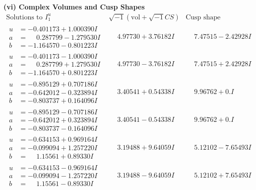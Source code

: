 \documentclass[1p]{elsarticle_modified}
\theoremstyle{definition}
\newcommand{\I}{\sqrt{-1}}
\begin{document}
\newpage\flushleft \textbf{(vi) Complex Volumes and Cusp Shapes}
$$\begin{array}{c|c|c}  
\text{Solutions to }I^u_{1}& \I (\text{vol} + \sqrt{-1}CS) & \text{Cusp shape}\\
 \hline 
\begin{aligned}
u &= -0.401173 + 1.000390 I \\
a &= \phantom{-}0.287799 - 1.279530 I \\
b &= -1.164570 - 0.801223 I\end{aligned}
 & \phantom{-}4.97730 + 3.76182 I & \phantom{-}7.47515 - 2.42928 I \\ \hline\begin{aligned}
u &= -0.401173 - 1.000390 I \\
a &= \phantom{-}0.287799 + 1.279530 I \\
b &= -1.164570 + 0.801223 I\end{aligned}
 & \phantom{-}4.97730 - 3.76182 I & \phantom{-}7.47515 + 2.42928 I \\ \hline\begin{aligned}
u &= -0.895129 + 0.707186 I \\
a &= -0.642012 - 0.323894 I \\
b &= -0.803737 + 0.164096 I\end{aligned}
 & \phantom{-}3.40541 + 0.54338 I & \phantom{-}9.96762 + 0. I\phantom{ +0.000000I} \\ \hline\begin{aligned}
u &= -0.895129 - 0.707186 I \\
a &= -0.642012 + 0.323894 I \\
b &= -0.803737 - 0.164096 I\end{aligned}
 & \phantom{-}3.40541 - 0.54338 I & \phantom{-}9.96762 + 0. I\phantom{ +0.000000I} \\ \hline\begin{aligned}
u &= -0.634153 + 0.969164 I \\
a &= -0.099094 + 1.257220 I \\
b &= \phantom{-}1.15561 + 0.89330 I\end{aligned}
 & \phantom{-}3.19488 + 9.64059 I & \phantom{-}5.12102 - 7.65493 I \\ \hline\begin{aligned}
u &= -0.634153 - 0.969164 I \\
a &= -0.099094 - 1.257220 I \\
b &= \phantom{-}1.15561 - 0.89330 I\end{aligned}
 & \phantom{-}3.19488 - 9.64059 I & \phantom{-}5.12102 + 7.65493 I \\ \hline\begin{aligned}

\end{aligned}
\end{array}$$
\end{document}
